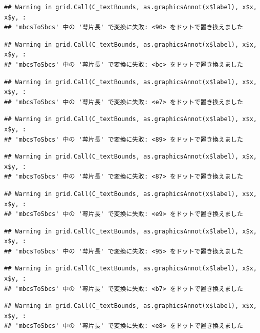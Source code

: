 \documentclass[
]{book}
\begin{document}
\begin{verbatim}
## Warning in grid.Call(C_textBounds, as.graphicsAnnot(x$label), x$x, x$y, :
## 'mbcsToSbcs' 中の '萼片長' で変換に失敗: <90> をドットで置き換えました
\end{verbatim}

\begin{verbatim}
## Warning in grid.Call(C_textBounds, as.graphicsAnnot(x$label), x$x, x$y, :
## 'mbcsToSbcs' 中の '萼片長' で変換に失敗: <bc> をドットで置き換えました
\end{verbatim}

\begin{verbatim}
## Warning in grid.Call(C_textBounds, as.graphicsAnnot(x$label), x$x, x$y, :
## 'mbcsToSbcs' 中の '萼片長' で変換に失敗: <e7> をドットで置き換えました
\end{verbatim}

\begin{verbatim}
## Warning in grid.Call(C_textBounds, as.graphicsAnnot(x$label), x$x, x$y, :
## 'mbcsToSbcs' 中の '萼片長' で変換に失敗: <89> をドットで置き換えました
\end{verbatim}

\begin{verbatim}
## Warning in grid.Call(C_textBounds, as.graphicsAnnot(x$label), x$x, x$y, :
## 'mbcsToSbcs' 中の '萼片長' で変換に失敗: <87> をドットで置き換えました
\end{verbatim}

\begin{verbatim}
## Warning in grid.Call(C_textBounds, as.graphicsAnnot(x$label), x$x, x$y, :
## 'mbcsToSbcs' 中の '萼片長' で変換に失敗: <e9> をドットで置き換えました
\end{verbatim}

\begin{verbatim}
## Warning in grid.Call(C_textBounds, as.graphicsAnnot(x$label), x$x, x$y, :
## 'mbcsToSbcs' 中の '萼片長' で変換に失敗: <95> をドットで置き換えました
\end{verbatim}

\begin{verbatim}
## Warning in grid.Call(C_textBounds, as.graphicsAnnot(x$label), x$x, x$y, :
## 'mbcsToSbcs' 中の '萼片長' で変換に失敗: <b7> をドットで置き換えました
\end{verbatim}

\begin{verbatim}
## Warning in grid.Call(C_textBounds, as.graphicsAnnot(x$label), x$x, x$y, :
## 'mbcsToSbcs' 中の '萼片長' で変換に失敗: <e8> をドットで置き換えました
\end{verbatim}
\end{document}
